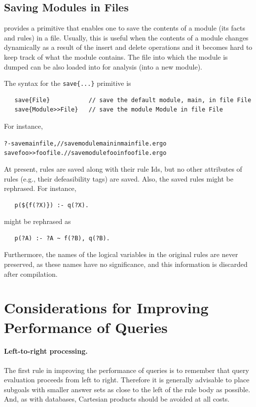 \documentclass[11pt]{article}
\newcommand{\ERGO}{\mbox{\smaller{\ensuremath{\cal{E}}\smaller{{\sc{RGO}}}}}\xspace}
\newcommand{\FLSYSTEM}{\ERGO}
\newcommand{\ergoext}{ergo\xspace}
\begin{document}
\subsection{Saving Modules in Files}

\FLSYSTEM provides a primitive that enables one to save the contents of a
module (its facts and rules) in a file. Usually, this is useful when the
contents of a module changes dynamically as a result of the insert and
delete operations and it becomes hard to keep track of what the module
contains.  The file into which the module is dumped can be also loaded into
\FLSYSTEM for analysis (into a new module).

The syntax for the \texttt{save\{...\}}  primitive is 
\begin{verbatim}
   save{File}           // save the default module, main, in file File
   save{Module>>File}   // save the module Module in file File
\end{verbatim}
For instance,
\begin{alltt}
    ?- save{mainfile},     // save module main in mainfile.\ergoext
       save{foo>>foofile}. // save module foo in foofile.\ergoext
\end{alltt}

At present, rules are saved along with their rule Ids, but no other
attributes of rules (e.g., their defeasibility tags)
are saved. Also, the saved rules might be rephrased. For instance,
\begin{verbatim}
   p(${f(?X)}) :- q(?X).
\end{verbatim}
might be rephrased as
\begin{verbatim}
   p(?A) :- ?A ~ f(?B), q(?B).
\end{verbatim}
Furthermore, the names of the logical variables in the original rules are never
preserved, as these names have no significance, and
this information is discarded after compilation.



\section{Considerations for Improving Performance of Queries}

\paragraph{Left-to-right processing.}
The first rule in improving the performance of \FLSYSTEM queries is to
remember that query evaluation proceeds from left to right. Therefore it is
generally advisable to place subgoals with smaller answer sets as close to
the left of the rule body as possible. And, as with databases, Cartesian
products should be avoided at all costs.
\end{document}
